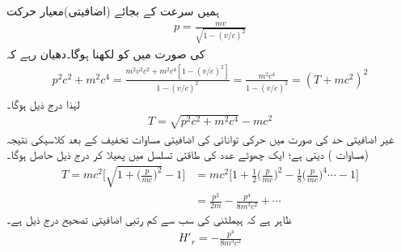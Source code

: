  ہمیں سرعت کے بجائے (اضافیتی)معیار حرکت
\begin{align}\label{مساوات_غیر_مضطرب_اضافیتی_معیار_حرکت}
p = \frac{mv}{\sqrt{1 - (v/c)^2}}
\end{align}
 کی صورت میں  کو لکھنا ہوگا۔دھیان رہے کہ
\begin{align*}
p^2 c^2 + m^2 c^4 = \frac{m^2 v^2 c^2 + m^2 c^4 [1 - (v/c)^2]}{1 - (v/c)^2} = \frac{m^2 c^4}{1 - (v/c)^2} = (T + mc^2)^2
\end{align*}
لہٰذا درج ذیل ہوگا۔
\begin{align}
T = \sqrt{p^2 c^2 + m^2 c^4} - mc^2
\end{align}
غیر اضافیتی حد  کی صورت میں حرکی توانائی کی اضافیتی مساوات تخفیف کے بعد کلاسیکی نتیجہ (مساوات ) دیتی ہے؛ ایک چھوٹے 
 عدد  کی طاقتی تسلسل میں پھیلا کر درج ذیل حاصل ہوگا۔
\begin{align}\label{مساوات_غیر_مضطرب_ٹی}
T = mc^2 \big [ \sqrt{1 + \big(\frac{p}{mc}\big)^2} - 1 \big ] &= mc^2 \big [ 1 + \frac{1}{2} \big(\frac{p}{mc}\big)^2 - \frac{1}{8} \big(\frac{p}{mc}\big)^4 \cdots - 1 \big ] \nonumber \\
&= \frac{p^2}{2m} - \frac{p^4}{8m^3 c^2} + \cdots 
\end{align}
ظاہر ہے کہ ہیملٹنی کی سب سے کم رتبی اضافیتی تصحیح درج ذیل ہے۔
\begin{align}\label{مساوات_غیر_مضطرب_سب_سے_کم_اضطراب}
H'_r = - \frac{p^4}{8m^3 c^2}
\end{align}

